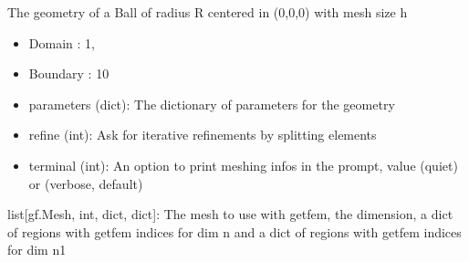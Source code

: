 \documentclass[letterpaper,10pt,english]{sphinxmanual}
\begin{document}
\begin{fulllineitems}
\label{\detokenize{scrimp.utils:scrimp.utils.mesh.Ball}}
\pysigstartsignatures
\pysiglinewithargsret
{}
{\sphinxparamcomma {}\sphinxparamcomma {}\sphinxparamcomma {}}
{}
\pysigstopsignatures
\sphinxAtStartPar
The geometry of a Ball of radius R centered in (0,0,0) with mesh size h
\begin{itemize}
\item {} 
\sphinxAtStartPar
Domain : 1,

\item {} 
\sphinxAtStartPar
Boundary : 10

\end{itemize}
\begin{description}
\begin{itemize}
\item {} 
\sphinxAtStartPar
parameters (dict): The dictionary of parameters for the geometry

\item {} 
\sphinxAtStartPar
refine (int): Ask for iterative refinements by splitting elements

\item {} 
\sphinxAtStartPar
terminal (int): An option to print meshing infos in the prompt, value  (quiet) or  (verbose, default)

\end{itemize}

\sphinxAtStartPar
list{[}gf.Mesh, int, dict, dict{]}: The mesh to use with getfem, the dimension, a dict of regions with getfem indices for dim n and a dict of regions with getfem indices for dim n\sphinxhyphen{}1

\end{description}

\end{fulllineitems}

\end{document}
